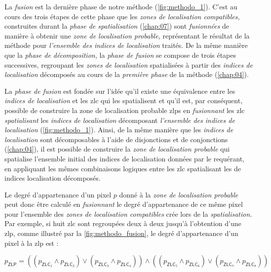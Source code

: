 La \emph{fusion} est la dernière phase de notre méthode
(\autoref{fig:methodo_1}). C'est au cours des trois étapes de cette
phase que les \emph{zones de localisation compatibles,} construites
durant la \emph{phase de spatialisation} (\autoref{chap:07}) sont
\emph{fusionnées} de manière à obtenir une \emph{zone de localisation
  probable,} représentant le résultat de la méthode pour
\emph{l'ensemble des indices de localisation} traités. De la même
manière que la \emph{phase de décomposition,} la \emph{phase de
  fusion} se compose de trois étapes successives, regroupant les
\emph{zones de localisation} spatialisées à partir des \emph{indices
  de localisation} décomposés au cours de la \emph{première phase} de
la méthode (\autoref{chap:04}).

La \emph{phase de fusion} est fondée sur l'idée qu'il existe une
équivalence entre les \emph{indices de localisation} et les \ac{zlc}
qui les spatialisent et qu'il est, par conséquent, possible de
construire la zone de localisation probable \acp{zlp} en
\emph{fusionnant} les \ac{zlc} \emph{spatialisant} les \emph{indices
  de localisation} décomposant \emph{l'ensemble des indices de
  localisation} (\autoref{fig:methodo_1}). Ainsi, de la même manière
que les \emph{indices de localisation} sont décomposables à l'aide de
disjonctions et de conjonctions (\autoref{chap:04}), il est possible
de construire la \emph{zone de localisation probable} qui spatialise
l'ensemble initial des indices de localisation données par le
requérant, en appliquant les mêmes combinaisons logiques entre les
\ac{zlc} spatialisant les de indices localisation décomposés.

Le degré d'appartenance d'un pixel \(p\) donné à la \emph{zone de
  localisation probable} peut donc être calculé en \emph{fusionnant}
le degré d'appartenance de ce même pixel pour l'ensemble des
\emph{zones de localisation compatibles} crée lors de la
\emph{spatialisation.} Par exemple, si huit \ac{zlc} sont regroupées
deux à deux jusqu'à l'obtention d'une \ac{zlp}, comme illustré par la
\autoref{fig:methodo_fusion}, le degré d'appartenance d'un pixel à la
\ac{zlp} est :

\begin{equation}
 p_{\mathsf{ZLP}} = \left((p_{\mathsf{ZLC}_1} \wedge
p_{\mathsf{ZLC}_2}) \vee (p_{\mathsf{ZLC}_3} \wedge
p_{\mathsf{ZLC}_4})\right) \wedge \left((p_{\mathsf{ZLC}_5} \wedge
p_{\mathsf{ZLC}_6}) \vee (p_{\mathsf{ZLC}_7} \wedge
p_{\mathsf{ZLC}_8})\right)
\end{equation}


